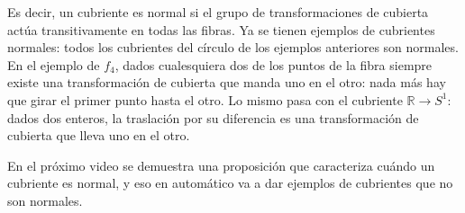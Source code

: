 \documentclass[11pt]{article}
\begin{document}
Es decir, un cubriente es normal si el grupo de transformaciones de cubierta actúa transitivamente en todas las fibras. Ya se tienen ejemplos de cubrientes normales: todos los cubrientes del círculo de los ejemplos anteriores son normales. En el ejemplo de $f_4$, dados cualesquiera dos de los puntos de la fibra siempre existe una transformación de cubierta que manda uno en el otro: nada más hay que girar el primer punto hasta el otro. Lo mismo pasa con el cubriente $\mathbb R\to S^1$: dados dos enteros, la traslación por su diferencia es una transformación de cubierta que lleva uno en el otro.

En el próximo video se demuestra una proposición que caracteriza cuándo un cubriente es normal, y eso en automático va a dar ejemplos de cubrientes que no son normales.

\begin{erratas}
\end{erratas}
\end{document}
